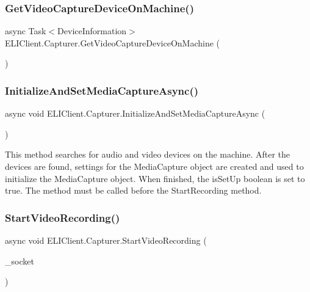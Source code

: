 \subsubsection{\texorpdfstring{Get\+Video\+Capture\+Device\+On\+Machine()}{GetVideoCaptureDeviceOnMachine()}}
{\footnotesize\ttfamily async Task$<$Device\+Information$>$ E\+L\+I\+Client.\+Capturer.\+Get\+Video\+Capture\+Device\+On\+Machine (\begin{DoxyParamCaption}{ }\end{DoxyParamCaption})\hspace{0.3cm}{\ttfamily [inline]}}

\mbox{\label{class_e_l_i_client_1_1_capturer_a5e64d7010dccca9d81ce8e758372a663}} 
\subsubsection{\texorpdfstring{Initialize\+And\+Set\+Media\+Capture\+Async()}{InitializeAndSetMediaCaptureAsync()}}
{\footnotesize\ttfamily async void E\+L\+I\+Client.\+Capturer.\+Initialize\+And\+Set\+Media\+Capture\+Async (\begin{DoxyParamCaption}{ }\end{DoxyParamCaption})\hspace{0.3cm}{\ttfamily [inline]}}



This method searches for audio and video devices on the machine. After the devices are found, settings for the Media\+Capture object are created and used to initialize the Media\+Capture object. When finished, the is\+Set\+Up boolean is set to true. The method must be called before the Start\+Recording method. 

\mbox{\label{class_e_l_i_client_1_1_capturer_a1532b94ee46eaef800f439b120ba1875}} 
\subsubsection{\texorpdfstring{Start\+Video\+Recording()}{StartVideoRecording()}}
{\footnotesize\ttfamily async void E\+L\+I\+Client.\+Capturer.\+Start\+Video\+Recording (\begin{DoxyParamCaption}\item[{Stream\+Socket}]{\+\_\+socket }\end{DoxyParamCaption})\hspace{0.3cm}{\ttfamily [inline]}}

